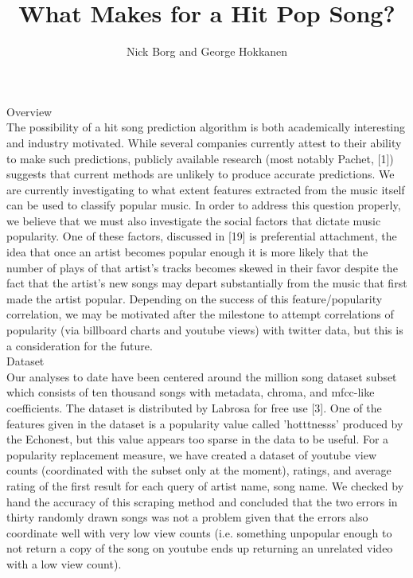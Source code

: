 \documentclass[11pt]{amsart}
\title{What Makes for a Hit Pop Song?}
\author{Nick Borg and George Hokkanen}
\begin{document}
\maketitle
{\huge Overview \huge} \\

The possibility of a hit song prediction algorithm is both academically interesting and industry motivated. While several companies currently attest to their ability to make such predictions, publicly available research (most notably Pachet, [1]) suggests that current methods are unlikely to produce accurate predictions. We are currently investigating to what extent features extracted from the music itself can be used to classify popular music. In order to address this question properly, we believe that we must also investigate the social factors that dictate music popularity. One of these factors, discussed in [19] is preferential attachment, the idea that once an artist becomes popular enough it is more likely that the number of plays of that artist's tracks becomes skewed in their favor despite the fact that the artist's new songs may depart substantially from the music that first made the artist popular. Depending on the success of this feature/popularity correlation, we may be motivated after the milestone to attempt correlations of popularity (via billboard charts and youtube views) with twitter data, but this is a consideration for the future. \\

{\huge Dataset \huge} \\

Our analyses to date have been centered around the million song dataset subset which consists of ten thousand songs with metadata, chroma, and mfcc-like coefficients. The dataset is distributed by Labrosa for free use [3]. One of the features given in the dataset is a popularity value called 'hotttnesss' produced by the Echonest, but this value appears too sparse in the data to be useful. For a popularity replacement measure, we have created a dataset of youtube view counts (coordinated with the subset only at the moment), ratings, and average rating of the first result for each query of artist name, song name. We checked by hand the accuracy of this scraping method and concluded that the two errors in thirty randomly drawn songs was not a problem given that the errors also coordinate well with very low view counts (i.e. something unpopular enough to not return a copy of the song on youtube ends up returning an unrelated video with a low view count). \\
\end{document}
